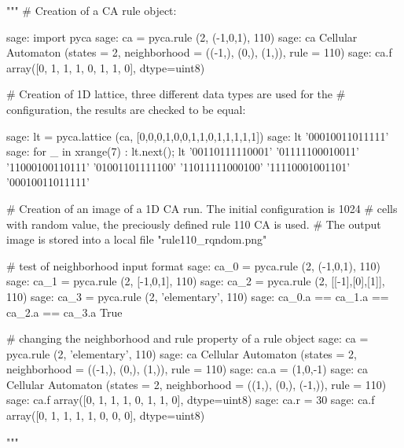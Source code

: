 """
# Creation of a CA rule object:

sage: import pyca
sage: ca = pyca.rule (2, (-1,0,1), 110)
sage: ca
Cellular Automaton (states = 2, neighborhood = ((-1,), (0,), (1,)), rule = 110)
sage: ca.f
array([0, 1, 1, 1, 0, 1, 1, 0], dtype=uint8)

# Creation of 1D lattice, three different data types are used for the
# configuration, the results are checked to be equal:

sage: lt = pyca.lattice (ca, [0,0,0,1,0,0,1,1,0,1,1,1,1,1])
sage: lt
'00010011011111'
sage: for _ in xrange(7) : lt.next(); lt
'00110111110001'
'01111100010011'
'11000100110111'
'01001101111100'
'11011111000100'
'11110001001101'
'00010011011111'

# Creation of an image of a 1D CA run. The initial configuration is 1024
# cells with random value, the preciously defined rule 110 CA is used.
# The output image is stored into a local file "rule110_rqndom.png"



# test of neighborhood input format
sage: ca_0 = pyca.rule (2, (-1,0,1), 110)
sage: ca_1 = pyca.rule (2, [-1,0,1], 110)
sage: ca_2 = pyca.rule (2, [[-1],[0],[1]], 110)
sage: ca_3 = pyca.rule (2, 'elementary', 110)
sage: ca_0.a == ca_1.a == ca_2.a == ca_3.a
True

# changing the neighborhood and rule property of a rule object
sage: ca = pyca.rule (2, 'elementary', 110)
sage: ca
Cellular Automaton (states = 2, neighborhood = ((-1,), (0,), (1,)), rule = 110)
sage: ca.a = (1,0,-1)
sage: ca
Cellular Automaton (states = 2, neighborhood = ((1,), (0,), (-1,)), rule = 110)
sage: ca.f
array([0, 1, 1, 1, 0, 1, 1, 0], dtype=uint8)
sage: ca.r = 30
sage: ca.f
array([0, 1, 1, 1, 1, 0, 0, 0], dtype=uint8)

"""

